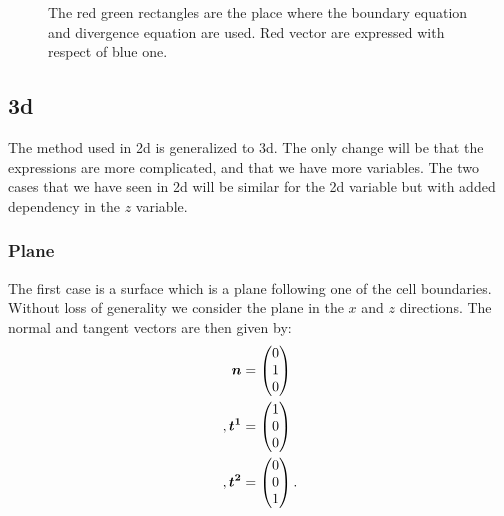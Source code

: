 \begin{figure}
\caption{The red green rectangles are the place where the boundary equation and divergence equation are used.
Red vector are expressed with respect of blue one.}
\label{topology:extrap:plane_45}
\end{figure}

\subsection{3d}
The method used in 2d is generalized to 3d. The only change will be that the expressions are more complicated, and that we have more variables.
The two cases that we have seen in 2d will be similar for the 2d variable but with added dependency in the $z$ variable.

\subsubsection{Plane}

The first case is a surface which is a plane following one of the cell boundaries.
Without loss of generality we consider the plane in the $x$ and $z$ directions.
The normal and tangent vectors are then given by:
\begin{align}
	{\boldsymbol {n}}&=\begin{pmatrix}
			0\\
			1\\
			0
		\end{pmatrix}\\,
	{\boldsymbol {t^1}}&=\begin{pmatrix}
			1\\
			0\\
			0
		\end{pmatrix}\\,
		{\boldsymbol {t^2}}&=\begin{pmatrix}
			0\\
			0\\
			1
		\end{pmatrix}.
\end{align}

